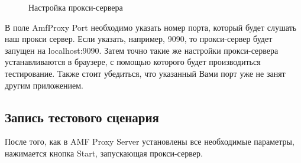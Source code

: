 \begin{figure}[ht]
\caption{Настройка прокси-сервера}
\label{ris:proxySettings.png}
\end{figure}

В поле AmfProxy Port необходимо указать номер порта, который будет слушать наш прокси сервер.
Если указать, например, 9090, то прокси-сервер будет запущен на localhost:9090.
Затем точно такие же настройки прокси-сервера устанавливаются в браузере, с помощью которого будет
производиться тестирование. Также стоит убедиться, что указанный Вами порт уже не занят другим приложением.

\subsection{Запись тестового сценария}

После того, как в AMF Proxy Server установлены все необходимые параметры, нажимается кнопка Start,
запускающая прокси-сервер.

